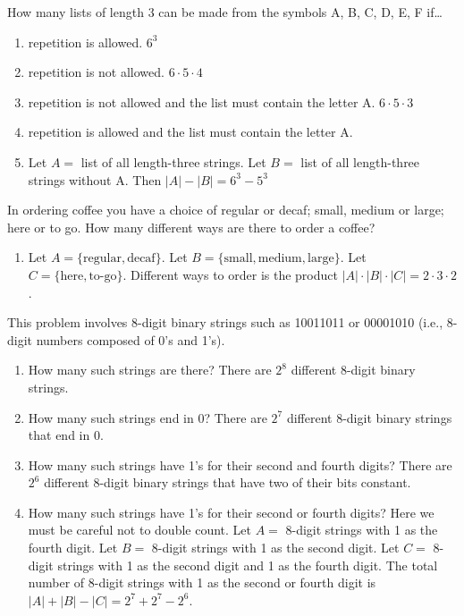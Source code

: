 \documentclass[openany, 11pt]{book}
\begin{document}
\begin{exercise}{}{}
	How many lists of length 3 can be made from the symbols A,
	B, C, D, E, F if\ldots
	\begin{enumerate}[label = {(\arabic*)}]
		\item repetition is allowed.
		      $ 6^3$
		\item repetition is not allowed.
		      $ 6\cdot 5 \cdot 4$
		\item repetition is not allowed and the list must contain the letter A.
		      $ 6\cdot 5 \cdot 3$
		\item repetition is allowed and the list must contain the letter A.
		\item Let $A=$ list of all length-three strings.
		      Let $B=$ list of all length-three strings without A.
		      Then $|A| - |B| = 6^3 - 5^3$
	\end{enumerate}
\end{exercise}

\begin{exercise}{}{}
	In ordering coffee you have a choice of regular or decaf; small, medium or
	large; here or to go. How many different ways are there to order a coffee?
	\begin{enumerate}[label = {(\arabic*)}]
		\item Let $A = \{\text{regular}, \text{decaf}\}$.
		      Let $B = \{\text{small}, \text{medium}, \text{large}\}$.
		      Let $C = \{\text{here}, \text{to-go}\}$.
		      Different ways to order is the product $|A|\cdot|B|\cdot|C| = 2 \cdot 3 \cdot 2$.
	\end{enumerate}
\end{exercise}

\begin{exercise}{}{}
	This problem involves 8-digit binary strings such as 10011011 or 00001010
	(i.e., 8-digit numbers composed of 0's and 1's).
	\begin{enumerate}[label = {(\alph*)}]
		\item How many such strings are there?
		      There are $2^8$ different 8-digit binary strings.
		\item How many such strings end in 0?
		      There are $2^7$ different 8-digit binary strings that end in $0$.
		\item How many such strings have 1's for their second and fourth digits?
		      There are $2^6$ different 8-digit binary strings that have two of
		      their bits constant.
		\item How many such strings have 1's for their second or fourth digits?
		      Here we must be careful not to double count.
		      Let $A =$ 8-digit strings with 1 as the fourth digit.
		      Let $B =$ 8-digit strings with 1 as the second digit.
		      Let $C =$ 8-digit strings with 1 as the second digit and 1 as the
		      fourth digit.
		      The total number of 8-digit strings with 1 as the second or fourth
		      digit is $|A| + |B| - |C| = 2^7+2^7-2^6$.
	\end{enumerate}
\end{exercise}
\end{document}
